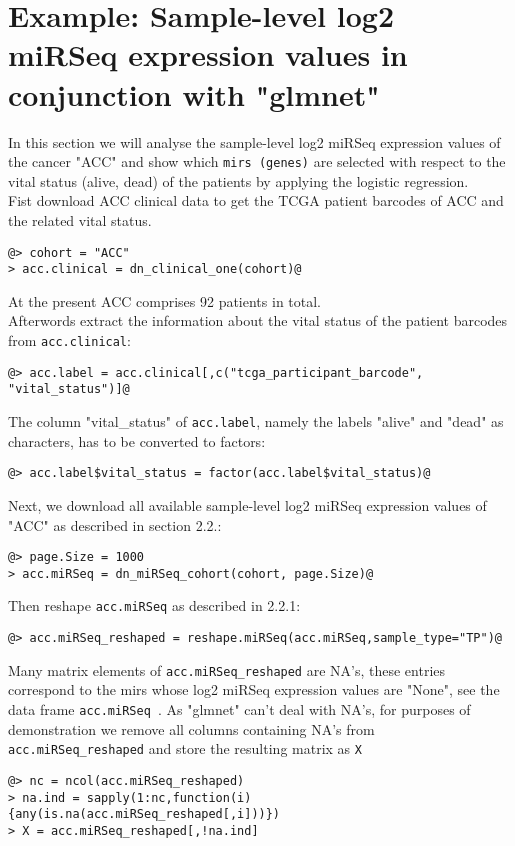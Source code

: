 \documentclass{TechReport}
\begin{document}
\section{Example: Sample-level log2 miRSeq expression values in conjunction with
"glmnet"}
In this section we will analyse the sample-level log2 miRSeq expression values of
the cancer "ACC" and show which
{\tt mirs (genes)} are selected with respect to the vital status (alive, dead) of
the patients by applying the logistic 
regression.\\
Fist download ACC clinical data to get the TCGA patient barcodes of ACC and the
related vital status.
\begin{lstlisting}[style=base]
@> cohort = "ACC"
> acc.clinical = dn_clinical_one(cohort)@
\end{lstlisting}
At the present ACC comprises 92 patients in total.\\ 
Afterwords extract the information about the vital status of the patient barcodes
from {\tt acc.clinical}:
\begin{lstlisting}[style=base]
@> acc.label = acc.clinical[,c("tcga_participant_barcode",
"vital_status")]@
\end{lstlisting}
The column "vital\_status" of {\tt acc.label}, namely the labels "alive" and "dead" as characters, 
has to be converted to factors:
\begin{lstlisting}[style=base]
@> acc.label$vital_status = factor(acc.label$vital_status)@
\end{lstlisting}
Next, we download all available sample-level log2 miRSeq expression values of "ACC"
as described in section 2.2.:
\begin{lstlisting}[style=base]
@> page.Size = 1000
> acc.miRSeq = dn_miRSeq_cohort(cohort, page.Size)@
\end{lstlisting}
Then reshape {\tt acc.miRSeq} as described in 2.2.1:
\begin{lstlisting}[style=base]
@> acc.miRSeq_reshaped = reshape.miRSeq(acc.miRSeq,sample_type="TP")@
\end{lstlisting}
Many matrix elements of {\tt acc.miRSeq\_reshaped} are NA's, these entries correspond
to the mirs whose log2 miRSeq expression values are "None", see the data frame {\tt acc.miRSeq }.
 As "glmnet" can't deal with NA's, for purposes of demonstration we remove all columns containing NA's
from {\tt acc.miRSeq\_reshaped} and store the resulting matrix as {\tt X}
\begin{lstlisting}[style=base]
@> nc = ncol(acc.miRSeq_reshaped)
> na.ind = sapply(1:nc,function(i){any(is.na(acc.miRSeq_reshaped[,i]))})
> X = acc.miRSeq_reshaped[,!na.ind]
\end{lstlisting}
\end{document}
